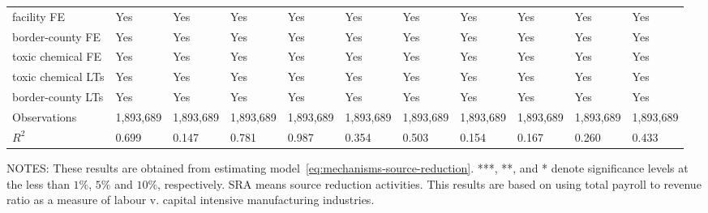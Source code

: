 \begin{table}[H]
{\begin{tabular}{@{}lllllllllll@{}}
            facility FE           & Yes       & Yes             & Yes        & Yes                   & Yes            & Yes       & Yes                   & Yes                 & Yes                   & Yes                 \\
            border-county FE      & Yes       & Yes             & Yes        & Yes                   & Yes            & Yes       & Yes                   & Yes                 & Yes                   & Yes                 \\
            toxic chemical FE     & Yes       & Yes             & Yes        & Yes                   & Yes            & Yes       & Yes                   & Yes                 & Yes                   & Yes                 \\
            toxic chemical LTs    & Yes       & Yes             & Yes        & Yes                   & Yes            & Yes       & Yes                   & Yes                 & Yes                   & Yes                 \\
            border-county LTs     & Yes       & Yes             & Yes        & Yes                   & Yes            & Yes       & Yes                   & Yes                 & Yes                   & Yes                 \\\midrule
            Observations          & 1,893,689 & 1,893,689       & 1,893,689  & 1,893,689             & 1,893,689      & 1,893,689 & 1,893,689             & 1,893,689           & 1,893,689             & 1,893,689           \\
            $R^2$                 & 0.699     & 0.147           & 0.781      & 0.987                 & 0.354          & 0.503     & 0.154                 & 0.167               & 0.260                 & 0.433               \\ \bottomrule\bottomrule
        \end{tabular}%
    }
    \begin{minipage}{\columnwidth}
        \vspace{0.05in}
        \tiny NOTES: These results are obtained from estimating model~\ref{eq:mechanisms-source-reduction}. ***, **, and * denote significance levels at the less than $1\%$, $5\%$ and $10\%$, respectively. SRA means source reduction activities. This results are based on using total payroll to revenue ratio as a measure of labour v. capital intensive manufacturing industries.
    \end{minipage}
\end{table}